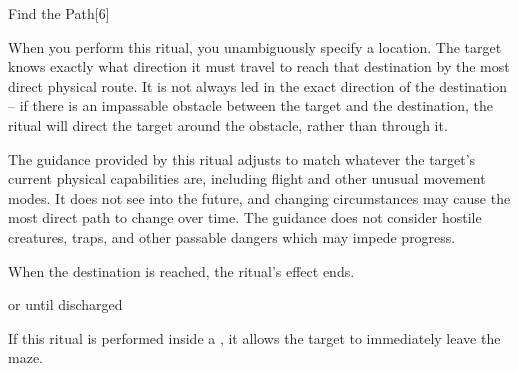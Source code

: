 \begin{spellsection}{Find the Path}[6]
    \begin{spellheader}
    \end{spellheader}
    \begin{spellcontent}
        \begin{spelltargetinginfo}
        \end{spelltargetinginfo}
        \begin{spelleffects}

            \spelleffect When you perform this ritual, you unambiguously specify a location. The target knows exactly what direction it must travel to reach that destination by the most direct physical route. It is not always led in the exact direction of the destination -- if there is an impassable obstacle between the target and the destination, the ritual will direct the target around the obstacle, rather than through it.

            The guidance provided by this ritual adjusts to match whatever the target's current physical capabilities are, including flight and other unusual movement modes. It does not see into the future, and changing circumstances may cause the most direct path to change over time. The guidance does not consider hostile creatures, traps, and other passable dangers which may impede progress.

            When the destination is reached, the ritual's effect ends.

            \spelldur \durext or until discharged \dismissable
        \end{spelleffects}
    \end{spellcontent}
    \begin{spellfooter}
        \spellnotes If this ritual is performed inside a , it allows the target to immediately leave the maze.

    \end{spellfooter}
\end{spellsection}

